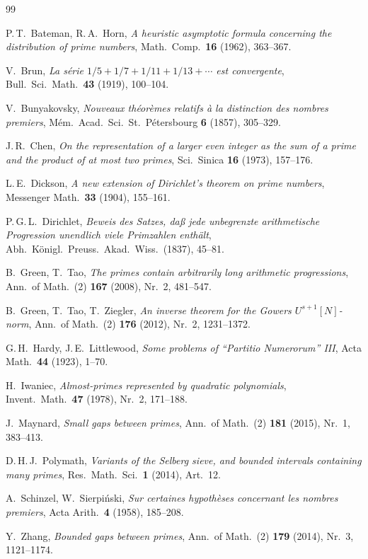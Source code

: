 \documentclass[12pt,a4paper]{amsart}
\theoremstyle{definition}
\theoremstyle{remark}
\begin{document}
\begin{thebibliography}{99}

P.\,T.\ Bateman, R.\,A.\ Horn,
\textit{A heuristic asymptotic formula concerning the distribution of prime numbers},
Math.\ Comp.\ \textbf{16} (1962), 363--367.

V.\ Brun,
\textit{La série $1/5+1/7+1/11+1/13+\cdots$ est convergente},
Bull.\ Sci.\ Math.\ \textbf{43} (1919), 100--104.

V.\ Bunyakovsky,
\textit{Nouveaux théorèmes relatifs à la distinction des nombres premiers},
Mém.\ Acad.\ Sci.\ St.\ Pétersbourg \textbf{6} (1857), 305--329.

J.\,R.\ Chen,
\textit{On the representation of a larger even integer as the sum of a prime and the
product of at most two primes},
Sci.\ Sinica \textbf{16} (1973), 157--176.

L.\,E.\ Dickson,
\textit{A new extension of Dirichlet's theorem on prime numbers},
Messenger Math.\ \textbf{33} (1904), 155--161.

P.\,G.\,L.\ Dirichlet,
\textit{Beweis des Satzes, daß jede unbegrenzte arithmetische Progression unendlich viele
Primzahlen enthält},
Abh.\ Königl.\ Preuss.\ Akad.\ Wiss.\ (1837), 45--81.

B.\ Green, T.\ Tao,
\textit{The primes contain arbitrarily long arithmetic progressions},
Ann.\ of Math.\ (2) \textbf{167} (2008), Nr.\ 2, 481--547.

B.\ Green, T.\ Tao, T.\ Ziegler,
\textit{An inverse theorem for the Gowers $U^{s+1}[N]$-norm},
Ann.\ of Math.\ (2) \textbf{176} (2012), Nr.\ 2, 1231--1372.

G.\,H.\ Hardy, J.\,E.\ Littlewood,
\textit{Some problems of ``Partitio Numerorum'' III},
Acta Math.\ \textbf{44} (1923), 1--70.

H.\ Iwaniec,
\textit{Almost-primes represented by quadratic polynomials},
Invent.\ Math.\ \textbf{47} (1978), Nr.\ 2, 171--188.

J.\ Maynard,
\textit{Small gaps between primes},
Ann.\ of Math.\ (2) \textbf{181} (2015), Nr.\ 1, 383--413.

D.\,H.\,J.\ Polymath,
\textit{Variants of the Selberg sieve, and bounded intervals containing many primes},
Res.\ Math.\ Sci.\ \textbf{1} (2014), Art.\ 12.

A.\ Schinzel, W.\ Sierpiński,
\textit{Sur certaines hypothèses concernant les nombres premiers},
Acta Arith.\ \textbf{4} (1958), 185--208.

Y.\ Zhang,
\textit{Bounded gaps between primes},
Ann.\ of Math.\ (2) \textbf{179} (2014), Nr.\ 3, 1121--1174.

\end{thebibliography}
\end{document}
